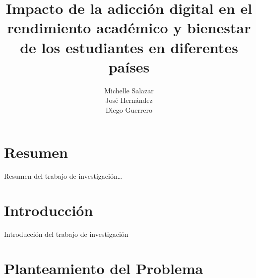 \documentclass[oneside,11pt]{Latex/Classes/PhDthesisPSnPDF}
\title{Impacto de la adicción digital en el rendimiento académico y
bienestar de los estudiantes en diferentes países}
\author{Michelle Salazar \\ José Hernández \\ Diego Guerrero}
\begin{document}
\maketitle

\frontmatter


\setcounter{secnumdepth}{3}
\setcounter{tocdepth}{3}

\tableofcontents



\cleardoublepage

  \cleardoublepage       %
  \chapter*{Resumen}     %
  
  Resumen del trabajo de
investigación\ldots{}             %
  
  \cleardoublepage

\mainmatter
\def\baselinestretch{1.5}

\chapter*{Introducción}

Introducción del trabajo de investigación

\chapter{Planteamiento del Problema}
\end{document}

